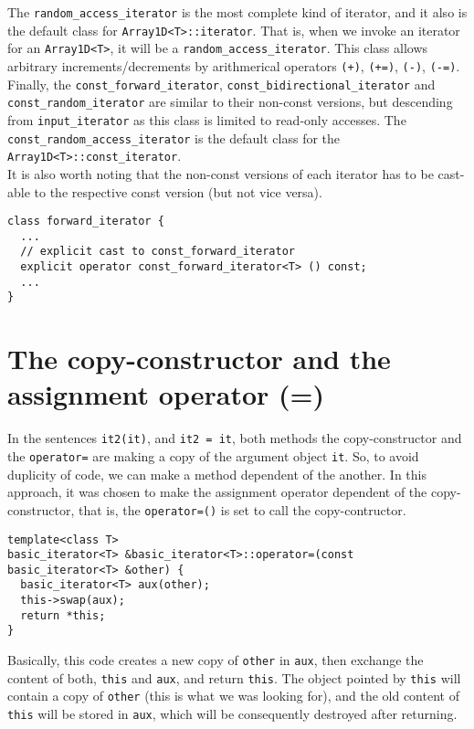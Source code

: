The {\tt random\_access\_iterator} is the most complete kind of iterator, and it also is the default class for {\tt Array1D<T>::iterator}. That is, when we invoke an iterator for an {\tt Array1D<T>}, it will be a {\tt random\_access\_iterator}. This class allows arbitrary increments/decrements by arithmerical operators {\tt (+)}, {\tt (+=)}, {\tt (-)}, {\tt (-=)}.
\\

Finally, the {\tt const\_forward\_iterator}, {\tt const\_bidirectional\_iterator} and {\tt const\_random\_iterator} are similar to their non-const versions, but descending from {\tt input\_iterator} as this class is limited to read-only accesses. The {\tt const\_random\_access\_iterator} is the default class for the {\tt Array1D<T>::const\_iterator}.
\\

It is also worth noting that the non-const versions of each iterator has to be cast-able to the respective const version (but not vice versa). 
\begin{verbatim}
class forward_iterator {
  ...
  // explicit cast to const_forward_iterator
  explicit operator const_forward_iterator<T> () const;
  ...
}
\end{verbatim}

\section{The copy-constructor and the assignment operator (=)}

In the sentences {\tt it2(it)}, and {\tt it2 = it}, both methods the copy-constructor and the {\tt operator=} are making a copy of the argument object {\tt it}. So, to avoid duplicity of code, we can make a method dependent of the another. In this approach, it was chosen to make the assignment operator dependent of the copy-constructor, that is, the {\tt operator=()} is set to call the copy-contructor.
\\

\begin{verbatim}
template<class T>
basic_iterator<T> &basic_iterator<T>::operator=(const basic_iterator<T> &other) {
  basic_iterator<T> aux(other);
  this->swap(aux);
  return *this;
}
\end{verbatim}

Basically, this code creates a new copy of {\tt other} in {\tt aux}, then exchange the content of both, {\tt *this} and {\tt aux}, and return {\tt *this}. The object pointed by {\tt this} will contain a copy of {\tt other} (this is what we was looking for), and the old content of {\tt *this} will be stored in {\tt aux}, which will be consequently destroyed after returning.
\\

